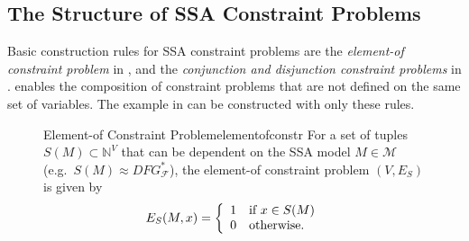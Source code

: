 \subsection{The Structure of SSA Constraint Problems}

    Basic construction rules for SSA constraint problems are the {\it element-of
    constraint problem} in ,
    and the {\it conjunction and disjunction constraint problems} in
    .
     enables the composition of constraint problems that are
    not defined on the same set of variables.
    The example in  can be constructed with only
    these rules.

\begin{figure}[p]
    \begin{definition}{Element-of Constraint Problem}{elementofconstr}
        For a set of tuples $S(M)\subset\mathbb N^V$ that can be dependent on
        the SSA model $M\in\mathcal M$ (e.g.\ $S(M)\approx DFG_\mathcal F^*$),
        the element-of constraint problem $(V,E_S)$ is given by
        \begin{align*}
            E_S(M,x)=\left\{\begin{array}{l}
                                1\text{\quad if }x \in S(M)\\
                                0\text{\quad otherwise}.
                            \end{array}\right.
        \end{align*}
    \end{definition}


\end{figure}
